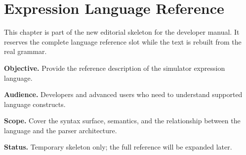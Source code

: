 \chapter{Expression Language Reference}
\label{chap:expression-language-reference}

This chapter is part of the new editorial skeleton for the developer manual. It reserves the complete language reference slot while the text is rebuilt from the real grammar.

\noindent\textbf{Objective.} Provide the reference description of the simulator expression language.

\noindent\textbf{Audience.} Developers and advanced users who need to understand supported language constructs.

\noindent\textbf{Scope.} Cover the syntax surface, semantics, and the relationship between the language and the parser architecture.

\noindent\textbf{Status.} Temporary skeleton only; the full reference will be expanded later.
